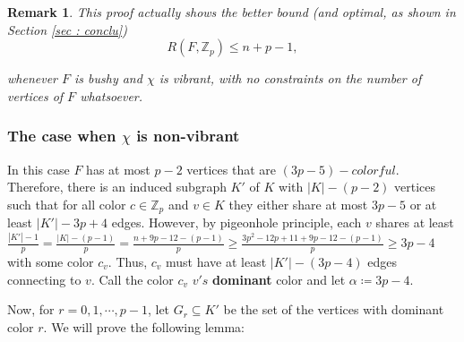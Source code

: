 \documentclass{article}
\numberwithin{table}{section}
\newtheorem{rem}[theorem]{Remark}
\begin{document}
\begin{rem}\label{refbushyvib}
This proof actually shows the better bound (and optimal, as shown in Section \ref{sec : conclu}) $$R(F,\mathbb{Z}_p)\leq n+p-1,$$

whenever $F$ is bushy and $\chi$ is vibrant, with no constraints on the number of vertices of $F$ whatsoever.
\end{rem}

\subsubsection{The case when $\chi$ is non-vibrant}\label{subsec: nvibrant}

In this case $F$ has at most $p-2$ vertices that are $(3p-5)-colorful$. Therefore, there is an induced subgraph $K'$ of $K$ with $|K|-(p-2)$ vertices such that for all color $c\in\mathbb{Z}_p$ and $v\in K$ they either share at most $3p-5$ or at least $|K'|-3p+4$ edges. However, by pigeonhole principle, each $v$ shares at least $\frac{|K'|-1}{p}  = \frac{|K|-(p-1)}{p} =\frac{n+9p-12-(p-1)}{p}\geq \frac{3p^2-12p+11+9p-12-(p-1)}{p}\geq 3p-4$ with some color $c_v$. Thus, $c_v$ must have at least $|K'|-(3p-4)$ edges connecting to $v$. Call the color $c_v$ $v's$ \textbf{dominant} color and let $\alpha \coloneq 3p-4$.
\medskip

Now, for $r = 0,1,\cdots,p-1$, let $G_r \subseteq K'$ be the set of the vertices with dominant color $r$. We will prove the following lemma:
\end{document}
